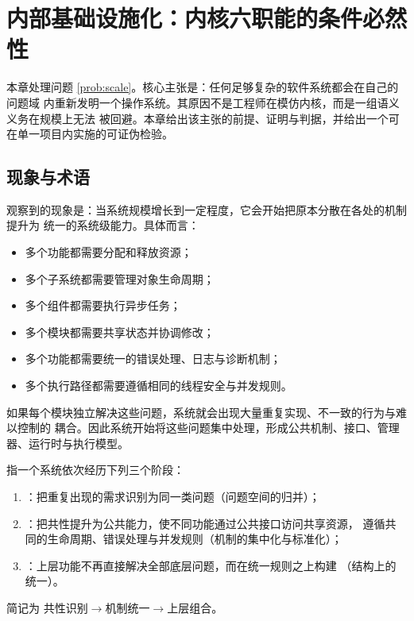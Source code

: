 \chapter[内部基础设施化]{内部基础设施化：内核六职能的条件必然性}\label{ch:infrastructure}

本章处理问题 \ref{prob:scale}。核心主张是：任何足够复杂的软件系统都会在自己的问题域
内重新发明一个操作系统。其原因不是工程师在模仿内核，而是一组语义义务在规模上无法
被回避。本章给出该主张的前提、证明与判据，并给出一个可在单一项目内实施的可证伪检验。

\section{现象与术语}\label{sec:phenomenon}

观察到的现象是：当系统规模增长到一定程度，它会开始把原本分散在各处的机制提升为
统一的系统级能力。具体而言：

\begin{itemize}
\item 多个功能都需要分配和释放资源；
\item 多个子系统都需要管理对象生命周期；
\item 多个组件都需要执行异步任务；
\item 多个模块都需要共享状态并协调修改；
\item 多个功能都需要统一的错误处理、日志与诊断机制；
\item 多个执行路径都需要遵循相同的线程安全与并发规则。
\end{itemize}

如果每个模块独立解决这些问题，系统就会出现大量重复实现、不一致的行为与难以控制的
耦合。因此系统开始将这些问题集中处理，形成公共机制、接口、管理器、运行时与执行模型。

\begin{definition}[内部基础设施化]\label{def:infra}
指一个系统依次经历下列三个阶段：
\begin{enumerate}[label=(\roman*)]
\item {}：把重复出现的需求识别为同一类问题（问题空间的归并）；
\item {}：把共性提升为公共能力，使不同功能通过公共接口访问共享资源，
      遵循共同的生命周期、错误处理与并发规则（机制的集中化与标准化）；
\item {}：上层功能不再直接解决全部底层问题，而在统一规则之上构建
      （结构上的统一）。
\end{enumerate}
简记为 $\boxed{\text{共性识别} \to \text{机制统一} \to \text{上层组合}}$。
\end{definition}

